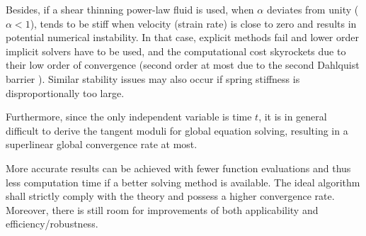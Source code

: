 \begin{enumerate}
Besides, if a shear thinning power-law fluid is used, when $\alpha$ deviates from unity ($\alpha<1$),  tends to be stiff when velocity (strain rate) is close to zero and results in potential numerical instability. In that case, explicit methods fail and lower order implicit solvers have to be used, and the computational cost skyrockets due to their low order of convergence (second order at most due to the second Dahlquist barrier \cite{Dahlquist1963}). Similar stability issues may also occur if spring stiffness is disproportionally too large.

Furthermore, since the only independent variable is time $t$, it is in general difficult to derive the tangent moduli for global equation solving, resulting in a superlinear global convergence rate at most.
\end{enumerate}
More accurate results can be achieved with fewer function evaluations and thus less computation time if a better solving method is available. The ideal algorithm shall strictly comply with the theory and possess a higher convergence rate. Moreover, there is still room for improvements of both applicability and efficiency/robustness.
